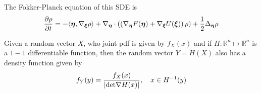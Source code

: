 \documentclass[11pt,twoside,a4paper]{article}
\begin{document}
The Fokker-Planck equation of this SDE is 
\begin{align}
    \frac{\partial \rho}{\partial t} = -\langle {\bm{\eta}}, \nabla_{{\bm{\xi}}} \rho\rangle + \nabla_{{\bm{\eta}}} \cdot \left( \left( \nabla _{{\bm{\eta}}}F({\bm{\eta}})  + \nabla_{{\bm{\xi}}} U({\bm{\xi}})
    \right) \rho\right) + \frac{1}{2} \Delta_{{\bm{\eta}}} \rho
 \end{align}
 
 
 \begin{remark} Given a random vector $X$, who joint pdf is given by $f_{X}(x)$ and if $H:\mathbb{R}^n \mapsto \mathbb{R}^n$ is a $1-1$ differentiable function, then the random vector $Y=H(X)$ also has a density function given by 
 \begin{align}
     f_{Y}(y)= \frac{f_X(x)}{\lvert {\rm{det}} \nabla H(x)\rvert}, 
     \quad x\in H^{-1}(y)
 \end{align}
 \end{remark}


\end{document}
